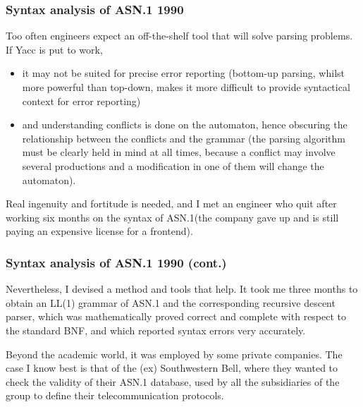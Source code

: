 \documentclass[compress,dvips,xcolor={dvipsnames},t]{beamer}
\newcommand\ASN{\textsf{ASN.1}\xspace}
\begin{document}

\begin{frame}
\frametitle{Syntax analysis of \ASN 1990}

Too often engineers expect an off-the-shelf tool that will solve
parsing problems. If Yacc is put to work,
\begin{itemize}

\item it may not be suited for precise error reporting (bottom-up
  parsing, whilst more powerful than top-down, makes it more
  difficult to provide syntactical context for error reporting)

\item and understanding conflicts is done on the automaton, hence
  obscuring the relationship between the conflicts and the grammar
  (the parsing algorithm must be clearly held in mind at all times,
  because a conflict may involve several productions and a
  modification in one of them will change the automaton).

\end{itemize}

\bigskip

Real ingenuity and fortitude is needed, and I met an engineer who quit
after working six months on the syntax of \ASN (the company gave up
and is still paying an expensive license for a frontend).

\end{frame}


\begin{frame}
\frametitle{Syntax analysis of \ASN 1990 (cont.)}

Nevertheless, I devised a method and tools that help. It took me three
months to obtain an LL(1) grammar of \ASN and the corresponding
recursive descent parser, which was mathematically proved correct and
complete with respect to the standard BNF, and which reported syntax
errors very accurately.

\bigskip

Beyond the academic world, it was employed by some private
companies. The case I know best is that of the (ex) Southwestern Bell,
where they wanted to check the validity of their \ASN database, used
by all the subsidiaries of the group to define their telecommunication
protocols.

\end{frame}

\end{document}
